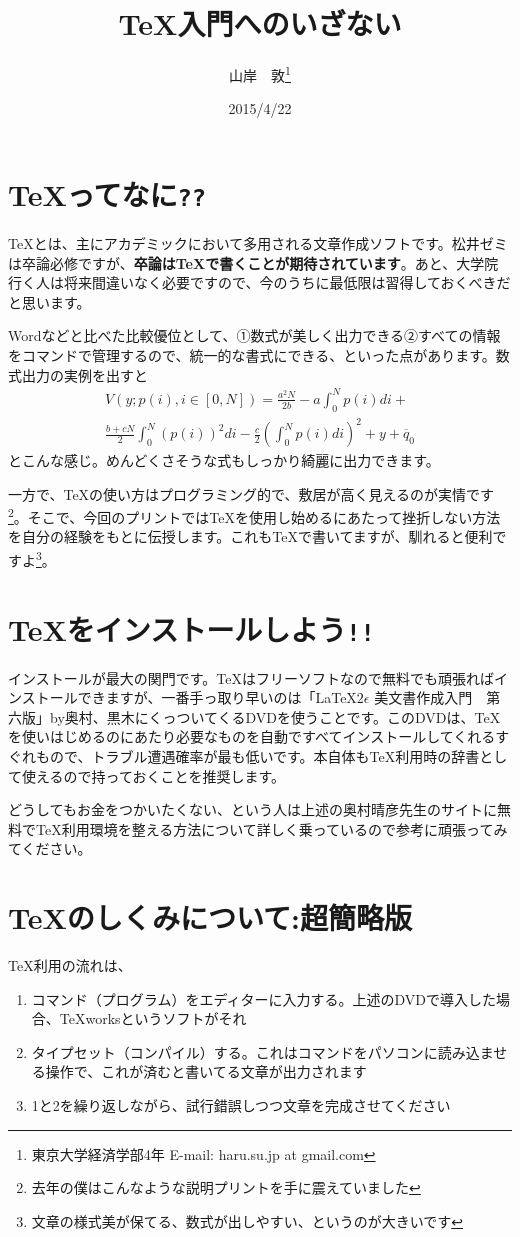 \documentclass[a4paper]{jarticle}
\title{\TeX 入門へのいざない}
\author{山岸　敦\thanks{東京大学経済学部4年 E-mail: haru.su.jp at gmail.com}}
\date{2015/4/22}
\begin{document}
\maketitle

\section{\TeX ってなに\texttt{??} }
\TeX とは、主にアカデミックにおいて多用される文章作成ソフトです。松井ゼミは卒論必修ですが、{\bf 卒論は\TeX で書くことが期待されています}。あと、大学院行く人は将来間違いなく必要ですので、今のうちに最低限は習得しておくべきだと思います。

Wordなどと比べた比較優位として、①数式が美しく出力できる②すべての情報をコマンドで管理するので、統一的な書式にできる、といった点があります。数式出力の実例を出すと
\begin{multline}
V(y;p(i), i \in[0, N]) = \frac{a^2N}{2b} - a \int_{0}^{N}p(i)di + \\
 \frac{b + cN}{2}\int_{0}^{N}(p(i))^2di - \frac{c}{2}(\int_{0}^{N}p(i)di)^2 + y + \overline{q}_0
\end{multline}
とこんな感じ。めんどくさそうな式もしっかり綺麗に出力できます。

一方で、\TeX の使い方はプログラミング的で、敷居が高く見えるのが実情です\footnote{去年の僕はこんなような説明プリントを手に震えていました}。そこで、今回のプリントでは\TeX を使用し始めるにあたって挫折しない方法を自分の経験をもとに伝授します。これも\TeX で書いてますが、馴れると便利ですよ\footnote{文章の様式美が保てる、数式が出しやすい、というのが大きいです}。

\section{\TeX をインストールしよう\texttt{!!}}
インストールが最大の関門です。\TeX はフリーソフトなので無料でも頑張ればインストールできますが、一番手っ取り早いのは「\LaTeX $2\epsilon$ 美文書作成入門　第六版」by奥村、黒木にくっついてくるDVDを使うことです。このDVDは、\TeX を使いはじめるのにあたり必要なものを自動ですべてインストールしてくれるすぐれもので、トラブル遭遇確率が最も低いです。本自体も\TeX 利用時の辞書として使えるので持っておくことを推奨します。

どうしてもお金をつかいたくない、という人は上述の奥村晴彦先生のサイトに無料で\TeX 利用環境を整える方法について詳しく乗っているので参考に頑張ってみてください。

\section{\TeX のしくみについて:超簡略版}
\TeX 利用の流れは、
\begin{enumerate}
\item
コマンド（プログラム）をエディターに入力する。上述のDVDで導入した場合、TeXworksというソフトがそれ
\item
タイプセット（コンパイル）する。これはコマンドをパソコンに読み込ませる操作で、これが済むと書いてる文章が出力されます
\item
1と2を繰り返しながら、試行錯誤しつつ文章を完成させてください
\end{enumerate}
\end{document}
